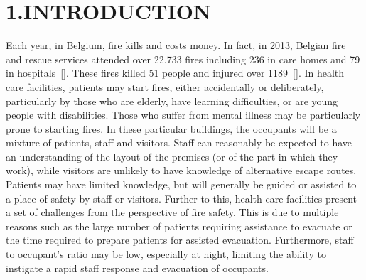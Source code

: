 \documentclass{style/llncs}
\begin{document}
\section{1.\hspace*{0.5em}INTRODUCTION}\label{sec-introduction}%

\noindent{}Each year, in Belgium, fire kills and costs money. In fact, in 2013,
Belgian fire and rescue services attended over 22.733 fires including 236
in care homes and 79 in hospitals~[]. These fires killed 51
people and injured over 1189~[]. In health care facilities,
patients may start fires, either accidentally or deliberately,
particularly by those who are elderly, have learning difficulties, or are
young people with disabilities. Those who suffer from mental illness may
be particularly prone to starting fires. In these particular buildings,
the occupants will be a mixture of patients, staff and visitors. Staff
can reasonably be expected to have an understanding of the layout of the
premises (or of the part in which they work), while visitors are unlikely
to have knowledge of alternative escape routes. Patients may have limited
knowledge, but will generally be guided or assisted to a place of safety
by staff or visitors. Further to this, health care facilities present a
set of challenges from the perspective of fire safety. This is due to
multiple reasons such as the large number of patients requiring
assistance to evacuate or the time required to prepare patients for
assisted evacuation. Furthermore, staff to occupant's ratio may be low,
especially at night, limiting the ability to instigate a rapid staff
response and evacuation of occupants.%
\end{document}
